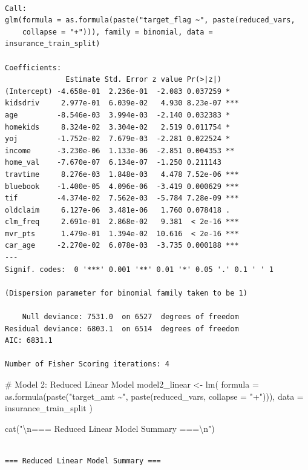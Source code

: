 \documentclass[
  11pt]{article}
\newenvironment{Shaded}{\begin{snugshade}}{\end{snugshade}}
\newcommand{\AttributeTok}[1]{\textcolor[rgb]{0.40,0.45,0.13}{#1}}
\newcommand{\CommentTok}[1]{\textcolor[rgb]{0.37,0.37,0.37}{#1}}
\newcommand{\FunctionTok}[1]{\textcolor[rgb]{0.28,0.35,0.67}{#1}}
\newcommand{\NormalTok}[1]{\textcolor[rgb]{0.00,0.23,0.31}{#1}}
\newcommand{\OtherTok}[1]{\textcolor[rgb]{0.00,0.23,0.31}{#1}}
\newcommand{\SpecialCharTok}[1]{\textcolor[rgb]{0.37,0.37,0.37}{#1}}
\newcommand{\StringTok}[1]{\textcolor[rgb]{0.13,0.47,0.30}{#1}}
\begin{document}
\begin{verbatim}

Call:
glm(formula = as.formula(paste("target_flag ~", paste(reduced_vars, 
    collapse = "+"))), family = binomial, data = insurance_train_split)

Coefficients:
              Estimate Std. Error z value Pr(>|z|)    
(Intercept) -4.658e-01  2.236e-01  -2.083 0.037259 *  
kidsdriv     2.977e-01  6.039e-02   4.930 8.23e-07 ***
age         -8.546e-03  3.994e-03  -2.140 0.032383 *  
homekids     8.324e-02  3.304e-02   2.519 0.011754 *  
yoj         -1.752e-02  7.679e-03  -2.281 0.022524 *  
income      -3.230e-06  1.133e-06  -2.851 0.004353 ** 
home_val    -7.670e-07  6.134e-07  -1.250 0.211143    
travtime     8.276e-03  1.848e-03   4.478 7.52e-06 ***
bluebook    -1.400e-05  4.096e-06  -3.419 0.000629 ***
tif         -4.374e-02  7.562e-03  -5.784 7.28e-09 ***
oldclaim     6.127e-06  3.481e-06   1.760 0.078418 .  
clm_freq     2.691e-01  2.868e-02   9.381  < 2e-16 ***
mvr_pts      1.479e-01  1.394e-02  10.616  < 2e-16 ***
car_age     -2.270e-02  6.078e-03  -3.735 0.000188 ***
---
Signif. codes:  0 '***' 0.001 '**' 0.01 '*' 0.05 '.' 0.1 ' ' 1

(Dispersion parameter for binomial family taken to be 1)

    Null deviance: 7531.0  on 6527  degrees of freedom
Residual deviance: 6803.1  on 6514  degrees of freedom
AIC: 6831.1

Number of Fisher Scoring iterations: 4
\end{verbatim}

\begin{Shaded}
\begin{Highlighting}[]
\CommentTok{\# Model 2: Reduced Linear Model}
\NormalTok{model2\_linear }\OtherTok{\textless{}{-}} \FunctionTok{lm}\NormalTok{(}
    \AttributeTok{formula =} \FunctionTok{as.formula}\NormalTok{(}\FunctionTok{paste}\NormalTok{(}\StringTok{"target\_amt \textasciitilde{}"}\NormalTok{, }\FunctionTok{paste}\NormalTok{(reduced\_vars, }\AttributeTok{collapse =} \StringTok{"+"}\NormalTok{))),}
    \AttributeTok{data =}\NormalTok{ insurance\_train\_split}
\NormalTok{)}

\FunctionTok{cat}\NormalTok{(}\StringTok{"}\SpecialCharTok{\textbackslash{}n}\StringTok{=== Reduced Linear Model Summary ===}\SpecialCharTok{\textbackslash{}n}\StringTok{"}\NormalTok{)}
\end{Highlighting}
\end{Shaded}

\begin{verbatim}

=== Reduced Linear Model Summary ===
\end{verbatim}
\end{document}
